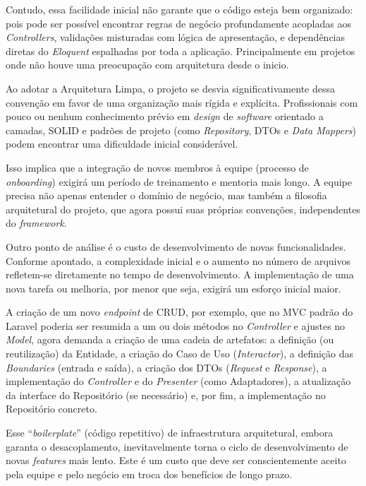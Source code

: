     \par Contudo, essa facilidade inicial não garante que o código esteja bem organizado: pois pode ser possível encontrar regras de negócio profundamente acopladas aos \textit{Controllers}, validações misturadas com lógica de apresentação, e dependências diretas do \textit{Eloquent} espalhadas por toda a aplicação. Principalmente em projetos onde não houve uma preocupação com arquitetura desde o inicio.
    
    \par Ao adotar a Arquitetura Limpa, o projeto se desvia significativamente dessa convenção em favor de uma organização mais rígida e explícita. Profissionais com pouco ou nenhum conhecimento prévio em \textit{design} de \textit{software} orientado a camadas, SOLID e padrões de projeto (como \textit{Repository}, DTOs e \textit{Data Mappers}) podem encontrar uma dificuldade inicial considerável.

    \par Isso implica que a integração de novos membros à equipe (processo de \textit{onboarding}) exigirá um período de treinamento e mentoria mais longo. A equipe precisa não apenas entender o domínio de negócio, mas também a filosofia arquitetural do projeto, que agora possui suas próprias convenções, independentes do \textit{framework}.
    
    \par Outro ponto de análise é o custo de desenvolvimento de novas funcionalidades. Conforme apontado, a complexidade inicial e o aumento no número de arquivos refletem-se diretamente no tempo de desenvolvimento. A implementação de uma nova tarefa ou melhoria, por menor que seja, exigirá um esforço inicial maior. 
    
    \par A criação de um novo \textit{endpoint} de CRUD, por exemplo, que no MVC padrão do Laravel poderia ser resumida a um ou dois métodos no \textit{Controller} e ajustes no \textit{Model}, agora demanda a criação de uma cadeia de artefatos: a definição (ou reutilização) da Entidade, a criação do Caso de Uso (\textit{Interactor}), a definição das \textit{Boundaries} (entrada e saída), a criação dos DTOs (\textit{Request} e \textit{Response}), a implementação do \textit{Controller} e do \textit{Presenter} (como Adaptadores), a atualização da interface do Repositório (se necessário) e, por fim, a implementação no Repositório concreto.
    
    \par Esse ``\textit{boilerplate}'' (código repetitivo) de infraestrutura arquitetural, embora garanta o desacoplamento, inevitavelmente torna o ciclo de desenvolvimento de novas \textit{features} mais lento. Este é um custo que deve ser conscientemente aceito pela equipe e pelo negócio em troca dos benefícios de longo prazo.
       
